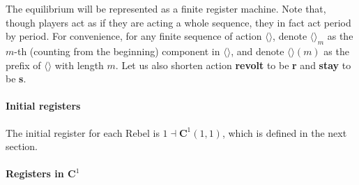 \documentclass[12pt,letter]{article}
\newcommand{\Kappa}{\mathbf{C}}
\theoremstyle{definition}
\theoremstyle{remark}
\theoremstyle{claim}
\begin{document}
The equilibrium will be represented as a {finite register machine}. Note that, though players act as if they are acting a whole sequence, they in fact act period by period. For convenience, for any finite sequence of action $\langle \rangle$, denote $\langle \rangle_m$ as the $m$-th (counting from the beginning) component in $\langle \rangle$, and denote $\langle \rangle(m)$ as the prefix of $\langle \rangle$ with length $m$. Let us also shorten action \textbf{revolt} to be \textbf{r} and \textbf{stay} to be \textbf{s}. 

\paragraph{Initial registers}
The initial register for each Rebel is $1\dashv\Kappa^1(1,1)$, which is defined in the next section.
\paragraph{Registers in $\Kappa^1$}
\end{document}
